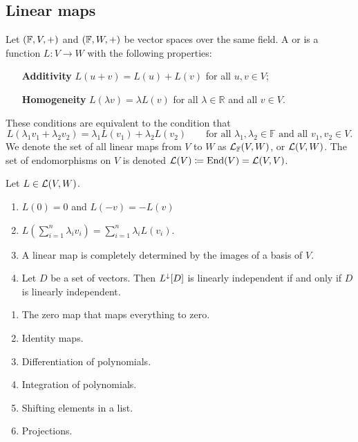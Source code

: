 \subsection{Linear maps}
\begin{definition}
Let $(\mathbb{F}, V, +)$ and $(\mathbb{F}, W, +)$ be vector spaces over the same field. A  or  is a function $L:V\to W$ with the following properties:
\begin{itemize}[leftmargin=3cm]
\item[\textbf{Additivity}] $L(u+v) = L(u)+L(v)$ for all $u,v \in V$;
\item[\textbf{Homogeneity}] $L(\lambda v) = \lambda L(v)$ for all $\lambda \in \mathbb{R}$ and all $v\in V$.
\end{itemize}
These conditions are equivalent to the condition that
\[ L(\lambda_1 v_1 + \lambda_2v_2) = \lambda_1L(v_1) + \lambda_2 L(v_2) \qquad \text{for all $\lambda_1,\lambda_2\in \mathbb{F}$ and all $v_1,v_2\in V$.} \]
We denote the set of all linear maps from $V$ to $W$ as $\operatorname{\mathcal{L}}_\mathbb{F}(V,W)$, or $\operatorname{\mathcal{L}}(V,W)$. The set of endomorphisms on $V$ is denoted $\operatorname{\mathcal{L}}(V) \coloneqq \operatorname{End}(V) = \operatorname{\mathcal{L}}(V,V)$.
\end{definition}

\begin{lemma} \label{linearMaps}
Let $L\in \operatorname{\mathcal{L}}(V,W)$.
\begin{enumerate}
\item $L(0) = 0$ and $L(-v) = -L(v)$
\item $L\left(\sum^n_{i=1}\lambda_i v_i\right) = \sum_{i=1}^n\lambda_i L(v_i)$.
\item A linear map is completely determined by the images of a basis of $V$.
\item Let $D$ be a set of vectors. Then $L^\downarrow[D]$ is linearly independent \textup{if and only if} $D$ is linearly independent.
\end{enumerate}
\end{lemma}

\begin{example}
\begin{enumerate}
\item The zero map that maps everything to zero.
\item Identity maps.
\item Differentiation of polynomials.
\item Integration of polynomials.
\item Shifting elements in a list.
\item Projections.
\end{enumerate}

\end{example}

